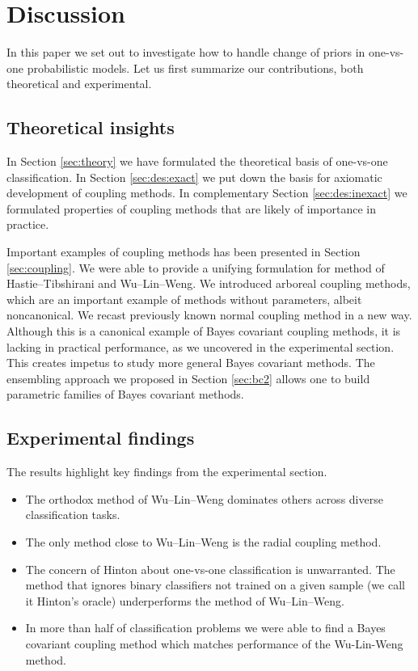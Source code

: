 \section{Discussion}

In this paper we set out to investigate how to handle change of priors in one-vs-one probabilistic models. Let us first summarize our contributions, both theoretical and experimental.

\subsection{Theoretical insights}

In Section \ref{sec:theory} we have formulated the theoretical basis of one-vs-one classification. In Section \ref{sec:des:exact} we put down the basis for axiomatic development of coupling methods. In complementary Section \ref{sec:des:inexact} we formulated properties of coupling methods that are likely of importance in practice.

Important examples of coupling methods has been presented in Section \ref{sec:coupling}. We were able to provide a unifying formulation for method of Hastie--Tibshirani and Wu--Lin--Weng. We introduced arboreal coupling methods, which are an important example of methods without parameters, albeit noncanonical. We recast previously known normal coupling method in a new way. Although this is a canonical example of Bayes covariant coupling methods,  it is lacking in practical performance, as  we uncovered in the experimental section. This creates impetus to study more general Bayes covariant methods. The  ensembling approach we proposed in Section \ref{sec:bc2} allows one to build parametric families of Bayes covariant methods.

\subsection{Experimental findings} 

The results highlight key findings from the experimental section.

\begin{itemize}
	\item The orthodox method of Wu--Lin--Weng dominates others across diverse classification tasks.
	\item The only method close to Wu--Lin--Weng is the radial coupling method.
	\item The concern of Hinton about one-vs-one classification is unwarranted. The method that ignores binary classifiers not trained on a given sample (we call it Hinton's oracle) underperforms the method of Wu--Lin--Weng.
	\item In more than half of classification problems we were able to find a Bayes covariant coupling method which matches performance of the Wu-Lin-Weng method. 
\end{itemize}



